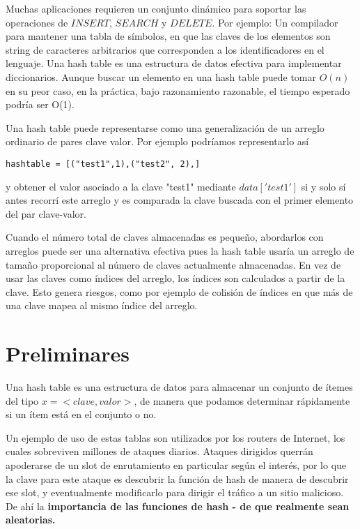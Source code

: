 Muchas aplicaciones requieren un conjunto dinámico para soportar las operaciones de $INSERT$, $SEARCH$ y $DELETE$. Por ejemplo: Un compilador para mantener una tabla de símbolos, en que las claves de los elementos son string de caracteres arbitrarios que corresponden a los identificadores en el lenguaje.
%
Una hash table es una estructura de datos efectiva para implementar diccionarios. Aunque buscar un elemento en una hash table puede tomar $O(n)$ en su peor caso, en la práctica, bajo razonamiento razonable, el tiempo esperado podría ser O(1). 

Una hash table puede representarse como una generalización de un arreglo ordinario de pares clave valor.  Por ejemplo podríamos representarlo así
\begin{lstlisting}
hashtable = [("test1",1),("test2", 2),]
\end{lstlisting}
y obtener el valor asociado a la clave "test1"  mediante $data['test1']$ si y solo sí antes recorrí este arreglo y es comparada la clave buscada con el primer elemento del par clave-valor.  

Cuando el número total de claves almacenadas es pequeño, abordarlos con arreglos puede ser una alternativa efectiva pues la hash table usaría un arreglo de tamaño proporcional al número de claves actualmente almacenadas. En vez de usar las claves como índices del arreglo, los índices son calculados a partir de la clave. Esto genera riesgos, como por ejemplo de colisión de índices en que más de una clave mapea al mismo índice del arreglo.

\section{Preliminares}

Una hash table es una estructura de datos para almacenar un conjunto de ítemes del tipo $x=<clave, valor>$, de manera que podamos determinar rápidamente si un ítem está en el conjunto o no. 



Un ejemplo de uso de estas tablas son utilizados por los routers de Internet, los cuales sobreviven millones de ataques diarios. Ataques dirigidos querrán apoderarse de un slot de enrutamiento en particular según el interés, por lo que la clave para este ataque es descubrir la función de hash de manera de descubrir ese slot, y eventualmente modificarlo para dirigir el tráfico a un sitio malicioso. De ahí la \textbf{importancia de las funciones de hash - de que realmente sean aleatorias.}

